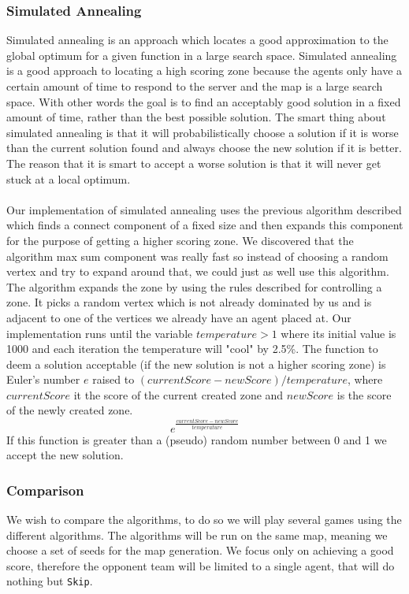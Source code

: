 \documentclass[11pt]{article}
\begin{document}
\subsubsection{Simulated Annealing}
Simulated annealing is an approach which locates a good approximation to the global optimum for a given function in a large search space. Simulated annealing is a good approach to locating a high scoring zone because the agents only have a certain amount of time to respond to the server and the map is a large search space. With other words the goal is to find an acceptably good solution in a fixed amount of time, rather than the best possible solution. The smart thing about simulated annealing is that it will probabilistically choose a solution if it is worse than the current solution found and always choose the new solution if it is better. The reason that it is smart to accept a worse solution is that it will never get stuck at a local optimum.\\
\\
Our implementation of simulated annealing uses the previous algorithm described which finds a connect component of a fixed size and then expands this component for the purpose of getting a higher scoring zone. We discovered that the algorithm max sum component was really fast so instead of choosing a random vertex and try to expand around that, we could just as well use this algorithm. The algorithm expands the zone by using the rules described for controlling a zone. It picks a random vertex which is not already dominated by us and is adjacent to one of the vertices we already have an agent placed at. Our implementation runs until the variable $temperature > 1$ where its initial value is 1000 and each iteration the temperature will "cool" by 2.5\%. The function to deem a solution acceptable (if the new solution is not a higher scoring zone) is Euler's number $e$ raised to $(currentScore - newScore) / temperature$, where $currentScore$ it the score of the current created zone and $newScore$ is the score of the newly created zone.
$$e^\frac{currentScore - newScore}{temperature}$$
If this function is greater than a (pseudo) random number between 0 and 1 we accept the new solution.

\subsubsection{Comparison}
We wish to compare the algorithms, to do so we will play several games using the different algorithms. The algorithms will be run on the same map, meaning we choose a set of seeds for the map generation. We focus only on achieving a good score, therefore the opponent team will be limited to a single agent, that will do nothing but {\tt Skip}.
\end{document}
